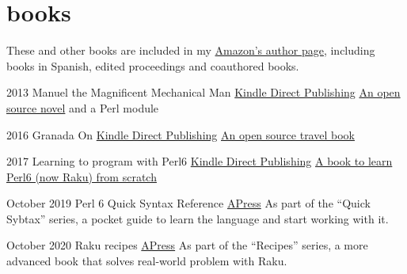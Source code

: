 \documentclass[]{friggeri-jj-cv}
\begin{document}
\newpage

\section{books}

These and other books are included in my
\href{https://amazon.com/author/jjmerelo}{Amazon's author page},
including books in Spanish, edited proceedings and coauthored books.

\begin{entrylist}
  \entry
    {2013}
    {Manuel the Magnificent Mechanical Man}
    {\href{http://www.amazon.com/dp/B00ED084BK/}{Kindle Direct Publishing}}
    {\href{http://jj.github.io/hoborg}{An open source novel} and a
      Perl module}

  \entry
    {2016}
    {Granada On}
    {\href{https://www.amazon.com/Granada-Beaten-Track-explorations-Andalusia/dp/1523257083}{Kindle Direct Publishing}}
    {\href{http://github.com/JJ/granada-off}{An open source travel book}}

  \entry
    {2017}
    {Learning to program with Perl6}
    {\href{https://www.amazon.com/Learning-program-Perl-Getting-programming/dp/1521795789/ref=sr_1_1?ie=UTF8&qid=1518685809&sr=8-1}{Kindle Direct Publishing}}
    {\href{http://github.com/JJ/perl6em}{A book to learn Perl6 (now
        Raku) from scratch}}

    \entry
    {October 2019}
    {Perl 6 Quick Syntax Reference}
    {\href{https://www.apress.com/gp/book/9781484249550}{APress}}
    {As part of the ``Quick Sybtax'' series, a pocket guide to learn
      the language and start working with it. }

  \entry
    {October 2020}
    {Raku recipes}
    {\href{https://www.apress.com/gp/book/9781484262573}{APress}}
    {As part of the ``Recipes'' series, a more advanced book that
      solves real-world problem with Raku. }

  \end{entrylist}
\end{document}
